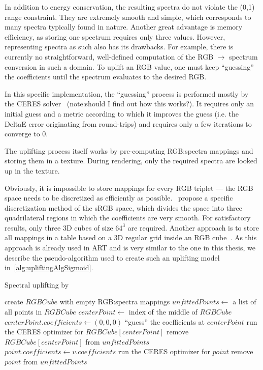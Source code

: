 In addition to energy conservation, the resulting spectra do not violate the (0,1) range constraint. They are extremely smooth and simple, which corresponds to many spectra typically found in nature. Another great advantage is memory efficiency, as storing one spectrum requires only three values. However, representing spectra as such also has its drawbacks. For example, there is currently no straightforward, well-defined computation of the RGB $\to$ spectrum conversion in such a domain. To uplift an RGB value, one must keep ``guessing'' the coefficients until the spectrum evaluates to the desired RGB.

In this specific implementation, the ``guessing'' process is performed mostly by the CERES solver~\cite{ceres-solver} (note:should I find out how this works?). It requires only an initial guess and a metric according to which it improves the guess (i.e. the DeltaE error originating from round-trips) and requires only a few iterations to converge to 0.

The uplifting process itself works by pre-computing RGB:spectra mappings and storing them in a texture. During rendering, only the required spectra are looked up in the texture.

Obviously, it is impossible to store mappings for every RGB triplet --- the RGB space needs to be discretized as efficiently as possible.~\citet{upsamplingJakobHanika} propose a specific discretization method of the sRGB space, which divides the space into three quadrilateral regions in which the coefficients are very smooth. For satisfactory results, only three 3D cubes of size $64^3$ are required. Another approach is to store all mappings in a table based on a 3D regular grid inside an RGB cube~\cite{upsamplingFluorescence}. As this approach is already used in ART and is very similar to the one in this thesis, we describe the pseudo-algorithm used to create such an uplifting model in~\cref{alg:upliftingAlgSigmoid}.

\begin{algorithm}[t!]
	\caption{Spectral uplifting by~\citet{upsamplingJakobHanika}}
	\label{alg:upliftingAlgSigmoid}
	\begin{algorithmic}[1]
		\State create $RGBCube$ with empty RGB:spectra mappings
		\State $unfittedPoints \gets$ a list of all points in $RGBCube$
		\State $centerPoint \gets$ index of the middle of $RGBCube$
		\Statex {}
		\State $centerPoint.coefficients \gets (0,0,0)$
		\Statex \Comment ``guess'' the coefficients at $centerPoint$
		\State run the CERES optimizer for $RGBCube[centerPoint]$
		\State remove $RGBCube[centerPoint]$ from $unfittedPoints$
		\State $point.coefficients \gets v.coefficients$
		\State run the CERES optimizer for $point$
		\State remove $point$ from $unfittedPoints$
		\EndIf
		\EndIf
		\EndFor
		\EndWhile
	\end{algorithmic}
\end{algorithm}


